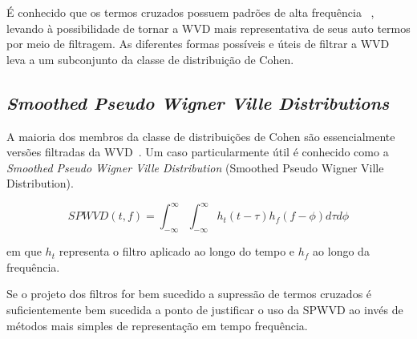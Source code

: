 É conhecido que os termos cruzados possuem padrões de alta frequência
~\cite{martinez}, levando à possibilidade de tornar a WVD mais representativa
de seus auto termos por meio de filtragem. As diferentes formas possíveis e
úteis de filtrar a WVD leva a um subconjunto da classe de distribuição de
Cohen.

\subsection{\emph{Smoothed Pseudo Wigner Ville Distributions}}

A maioria dos membros da classe de distribuições de Cohen são essencialmente
versões filtradas da WVD~\cite{tfr_comparison}. Um caso particularmente útil
é conhecido como a \emph{Smoothed Pseudo Wigner Ville Distribution}
(Smoothed Pseudo Wigner Ville Distribution).

$$ SPWVD(t, f) = \int_{-\infty}^{\infty}\int_{-\infty}^{\infty} h_t (t - \tau) h_f(f - \phi)d\tau d\phi $$

em que $h_t$ representa o filtro aplicado ao longo do tempo e $h_f$ ao longo
da frequência.

Se o projeto dos filtros for bem sucedido a supressão de termos cruzados é
suficientemente bem sucedida a ponto de justificar o uso da SPWVD ao invés de
métodos mais simples de representação em tempo frequência.

